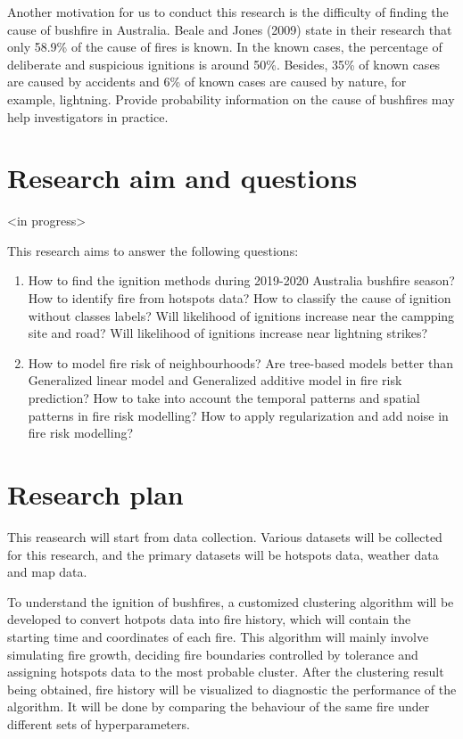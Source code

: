 \documentclass{monashthesis}
\begin{document}
Another motivation for us to conduct this research is the difficulty of
finding the cause of bushfire in Australia. Beale and Jones (2009) state
in their research that only 58.9\% of the cause of fires is known. In
the known cases, the percentage of deliberate and suspicious ignitions
is around 50\%. Besides, 35\% of known cases are caused by accidents and
6\% of known cases are caused by nature, for example, lightning. Provide
probability information on the cause of bushfires may help investigators
in practice.

\section{Research aim and questions}\label{research-aim-and-questions}

\textless{}in progress\textgreater{}

This research aims to answer the following questions:

\begin{enumerate}
\def\labelenumi{\arabic{enumi}.}
\tightlist
\item
  How to find the ignition methods during 2019-2020 Australia bushfire
  season? How to identify fire from hotspots data? How to classify the
  cause of ignition without classes labels? Will likelihood of ignitions
  increase near the campping site and road? Will likelihood of ignitions
  increase near lightning strikes?
\item
  How to model fire risk of neighbourhoods? Are tree-based models better
  than Generalized linear model and Generalized additive model in fire
  risk prediction? How to take into account the temporal patterns and
  spatial patterns in fire risk modelling? How to apply regularization
  and add noise in fire risk modelling?
\end{enumerate}

\section{Research plan}\label{research-plan}

This reasearch will start from data collection. Various datasets will be
collected for this research, and the primary datasets will be hotspots
data, weather data and map data.

To understand the ignition of bushfires, a customized clustering
algorithm will be developed to convert hotpots data into fire history,
which will contain the starting time and coordinates of each fire. This
algorithm will mainly involve simulating fire growth, deciding fire
boundaries controlled by tolerance and assigning hotspots data to the
most probable cluster. After the clustering result being obtained, fire
history will be visualized to diagnostic the performance of the
algorithm. It will be done by comparing the behaviour of the same fire
under different sets of hyperparameters.
\end{document}
